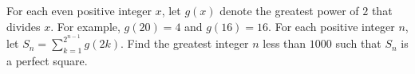 For each even positive integer $x$, let $g(x)$ denote the greatest power of $2$ that divides $x$.  For example, $g(20)=4$ and $g(16)=16$.  For each positive integer $n$, let $S_n=\sum_{k=1}^{2^{n-1}}g(2k).$  Find the greatest integer $n$ less than $1000$ such that $S_n$ is a perfect square.